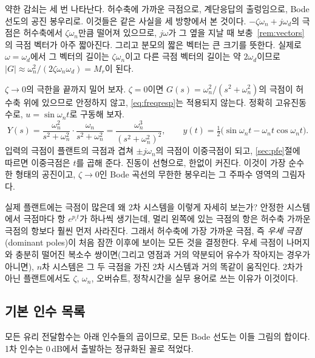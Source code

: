 \documentclass[11pt]{article}
\begin{document}
\begin{remark}[한 사실, 세 그림]
약한 감쇠는 세 번 나타난다. 허수축에 가까운 극점으로, 계단응답의 출렁임으로,
Bode 선도의 공진 봉우리로. 이것들은 같은 사실을 세 방향에서 본 것이다.
$-\zeta\omega_n+j\omega_d$의 극점은 허수축에서 $\zeta\omega_n$만큼 떨어져 있으므로,
$j\omega$가 그 옆을 지날 때 보충~\ref{rem:vectors}의 극점 벡터가 아주 짧아진다.
그리고 분모의 짧은 벡터는 큰 크기를 뜻한다. 실제로 $\omega=\omega_d$에서 그
벡터의 길이는 $\zeta\omega_n$이고 다른 극점 벡터의 길이는 약 $2\omega_d$이므로
$|G|\approx\omega_n^{2}/(2\zeta\omega_n\omega_d)=M_r$이 된다.
\end{remark}

\begin{example}[감쇠 없는 공진]
$\zeta\to0$의 극한을 끝까지 밀어 보자. $\zeta=0$이면
$G(s)=\omega_n^{2}/(s^{2}+\omega_n^{2})$의 극점이 허수축 위에 있으므로 안정하지
않고, \eqref{eq:freqresp}는 적용되지 않는다. 정확히 고유진동수로,
$u=\sin\omega_n t$로 구동해 보자.
\[
   Y(s) = \frac{\omega_n^{2}}{s^{2}+\omega_n^{2}}\cdot\frac{\omega_n}{s^{2}+\omega_n^{2}}
        = \frac{\omega_n^{3}}{(s^{2}+\omega_n^{2})^{2}},
   \qquad
   y(t) = \tfrac12\bigl(\sin\omega_n t-\omega_n t\cos\omega_n t\bigr).
\]
입력의 극점이 플랜트의 극점과 겹쳐 $\pm j\omega_n$의 극점이 이중극점이 되고,
\ref{sec:pfe}절에 따르면 이중극점은 $t$를 곱해 준다. 진동이 선형으로, 한없이
커진다. 이것이 가장 순수한 형태의 공진이고, $\zeta\to0$인 Bode 곡선의 무한한
봉우리는 그 주파수 영역의 그림자다.
\end{example}

\begin{remark}[우세 극점]\label{rem:dominant}
실제 플랜트에는 극점이 많은데 왜 2차 시스템을 이렇게 자세히 보는가? 안정한
시스템에서 극점마다 항 $e^{p_it}$가 하나씩 생기는데, 멀리 왼쪽에 있는 극점의
항은 허수축 가까운 극점의 항보다 훨씬 먼저 사라진다. 그래서 허수축에 가장 가까운
극점, 즉 \emph{우세 극점}(dominant poles)이 처음 잠깐 이후에 보이는 모든 것을
결정한다. 우세 극점이 나머지와 충분히 떨어진 복소수 쌍이면(그리고 영점과 거의
약분되어 유수가 작아지는 경우가 아니면), $n$차 시스템은 그 두 극점을 가진 2차
시스템과 거의 똑같이 움직인다. 2차가 아닌 플랜트에서도 $\zeta$, $\omega_n$,
오버슈트, 정착시간을 실무 용어로 쓰는 이유가 이것이다.
\end{remark}

\subsection{기본 인수 목록}\label{sec:catalogue}
모든 유리 전달함수는 아래 인수들의 곱이므로, 모든 Bode 선도는 이들 그림의 합이다.
1차 인수는 $0$\,dB에서 출발하는 정규화된 꼴로 적었다.
\end{document}
